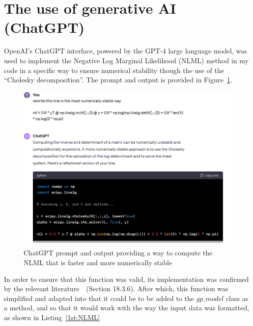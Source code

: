 \appendix
\section{The use of generative AI (ChatGPT)}
OpenAI's ChatGPT interface, powered by the GPT-4 large language model, was used to implement the Negative Log Marginal Likelihood (NLML) method in my code in a specific way to ensure numerical stability though the use of the ``Cholesky decomposition''.
The prompt and output is provided in Figure~\ref{fig:chat-NLML}.
\begin{figure}[htbp]
    \centering
    \includegraphics[width=1\linewidth]{figures/chat-NLML/chat-NLML.png}
    \caption{ChatGPT prompt and output providing a way to compute the NLML that is faster and more numerically stable}
    \label{fig:chat-NLML}
\end{figure}

\FloatBarrier

In order to ensure that this function was valid, its implementation was confirmed by the relevant literature~\cite{murphy2023probabilistic}~(Section 18.3.6).
After which, this function was simplified and adapted into that it could be to be added to the $gp\_model$ class as a method, and so that it would work with the way the input data was formatted, as shown in Listing~\ref{1st:NLML}

